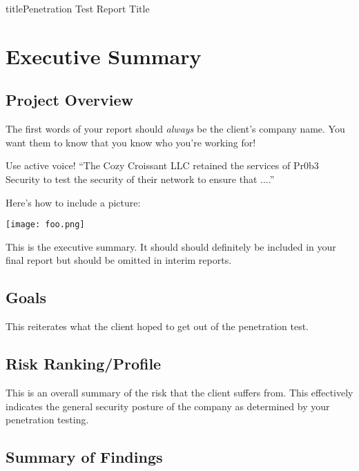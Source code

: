 \documentclass[notitlepage]{article}
\begin{document}
  
title{Penetration Test Report Title}
\author{Your Name}
\date{\isodate\today}

\maketitle

\tableofcontents

\newpage
\section{Executive Summary}



\subsection{Project Overview}
The first words of your report should \emph{always} be the client's company name.
You want them to know that you know who you're working for!

Use active voice!
``The Cozy Croissant LLC retained the services of Pr0b3 Security to test the security of their network to ensure that ....''

Here's how to include a picture:

\texttt{[image: foo.png]}

This is the executive summary.
It should should definitely be included in your final report but should be omitted in interim reports.


\subsection{Goals}

This reiterates what the client hoped to get out of the penetration
test.

\subsection{Risk Ranking/Profile}

This is an overall summary of the risk that the client suffers from. This effectively indicates the general security posture of the company as determined by your penetration testing.

\subsection{Summary of Findings}
\end{document}
